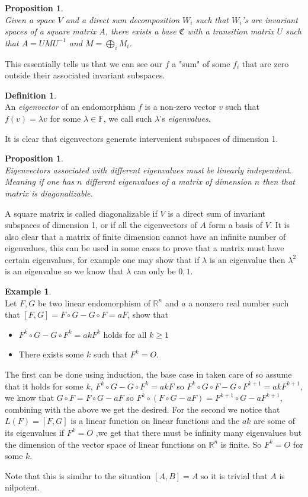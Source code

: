 \documentclass[12pt]{article}
\newtheorem{prop}[theorem]{Proposition}
\theoremstyle{definition}
\newtheorem{definition}[theorem]{Definition}
\newtheorem*{example}{Example}
\theoremstyle{remark}
\theoremstyle{plain}
\begin{document}
\begin{prop}\leavevmode \\
	Given a space $V$ and a direct sum decomposition $W_i$ such that $W_i$'s are invariant spaces of a square matrix $ A $, there exists a base $\mathfrak{C}$ with a transition matrix $U$ such that $ A =UMU^{-1}$ and $ M=\bigoplus_i M_i$.
\end{prop}
This essentially tells us that we can see our $f$ a "sum" of some $f_i$ that are zero outside their associated invariant subspaces.
\begin{definition}\leavevmode \\
An \textit{eigenvector} of an endomorphism $f$ is a non-zero vector $v$ such that $f(v)=\lambda v$ for some $ \lambda \in \mathbb{F} $, we call such $ \lambda $'s \textit{eigenvalues}.
\end{definition}
It is clear that eigenvectors generate intervenient subspaces of dimension 1.
\begin{prop}\leavevmode \\
Eigenvectors associated with different eigenvalues must be linearly independent. Meaning if one has $n$ different eigenvalues of a matrix of dimension $ n$ then that matrix is diagonalizable.
\end{prop}
	A square matrix is called diagonalizable if $V$ is a direct sum of invariant subspaces of dimension 1, or if all the eigenvectors of $A$ form a basis of $V$. It is also clear that a matrix of finite dimension cannot have an infinite number of eigenvalues, this can be used in some cases to prove that a matrix must have certain eigenvalues, for example one may show that if $\lambda$ is an eigenvalue then $\lambda^2$ is an eigenvalue so we know that $\lambda$ can only be $0,1$. 
\begin{example}\leavevmode \\
	Let $F,G$ be two linear endomorphism of $\mathbb{R}^n$ and $a$ a nonzero real number such that $[F,G]=F\circ G-G\circ F=aF$, show that \begin{itemize}
		\item $F^k\circ G- G\circ F^k=akF^k$ holds for all $k\geq 1$
		\item There exists some $k$ such that $F^k=O$. 
	\end{itemize} 
	The first can be done using induction, the base case in taken care of so assume that it holds for some $k$, $F^k \circ G-G \circ F^k=akF$ so $F^k\circ G \circ F- G\circ F^{k+1}=akF^{k+1}$, we know that $G\circ F=F\circ G-aF$ so $F^k \circ (F \circ G-aF)= F^{k+1}\circ G-aF^{k+1}$, combining with the above we get the desired.
	For the second we notice that $L(F)=[F,G]$ is a linear function on linear functions and the $ak$ are some of its eigenvalues if $F^k=O$ ,we get that there must be infinity many eigenvalues but the dimension of the vector space of linear functions on $\mathbb{R}^n$ is finite. So $F^k=O$ for some $k$.
\end{example}
Note that this is similar to the situation $[A,B]=A$ so it is trivial that $A$ is nilpotent.
\end{document}
